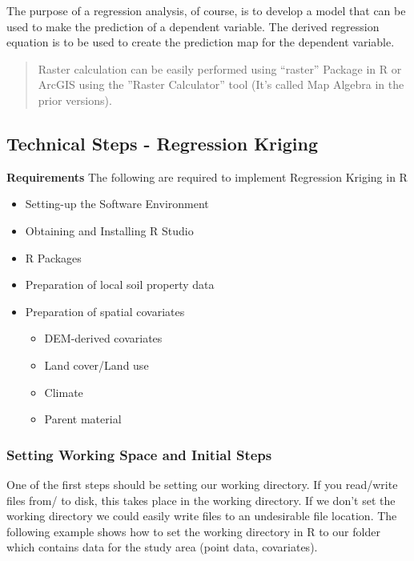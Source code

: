 \documentclass[10pt,b5paper,]{book}
\theoremstyle{definition}
\theoremstyle{definition}
\theoremstyle{definition}
\theoremstyle{remark}
\begin{document}
The purpose of a regression analysis, of course, is to develop a model
that can be used to make the prediction of a dependent variable. The
derived regression equation is to be used to create the prediction map
for the dependent variable.

\begin{quote}
Raster calculation can be easily performed using ``raster'' Package in R
or ArcGIS using the ''Raster Calculator'' tool (It's called Map Algebra
in the prior versions).
\end{quote}

\hypertarget{technical-steps---regression-kriging}{%
\subsection{Technical Steps - Regression
Kriging}\label{technical-steps---regression-kriging}}

\textbf{Requirements} The following are required to implement Regression
Kriging in R

\begin{itemize}
\item
  Setting-up the Software Environment
\item
  Obtaining and Installing R Studio
\item
  R Packages
\item
  Preparation of local soil property data
\item
  Preparation of spatial covariates

  \begin{itemize}
  \item
    DEM-derived covariates
  \item
    Land cover/Land use
  \item
    Climate
  \item
    Parent material
  \end{itemize}
\end{itemize}

\hypertarget{setting-working-space-and-initial-steps}{%
\subsubsection{Setting Working Space and Initial
Steps}\label{setting-working-space-and-initial-steps}}

One of the first steps should be setting our working directory. If you
read/write files from/ to disk, this takes place in the working
directory. If we don't set the working directory we could easily write
files to an undesirable file location. The following example shows how
to set the working directory in R to our folder which contains data for
the study area (point data, covariates).
\end{document}
